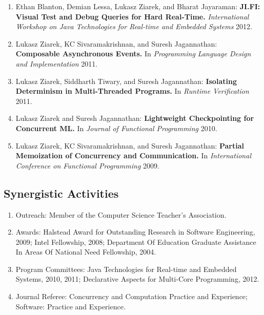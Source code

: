 \documentclass[times,11pt]{article}
\begin{document}
\noindent
\begin{enumerate}\setlength{\itemsep}{\myspace}

\item Ethan Blanton, Demian Lessa, Lukasz Ziarek, and Bharat Jayaraman:                                                                                                 
{\bf JI.FI: Visual Test and Debug Queries for Hard Real-Time.}                                                                                                          
{\it International Workshop on Java Technologies for Real-time and Embedded Systems} 2012.  

\item Lukasz Ziarek, KC Sivaramakrishnan, and Suresh Jagannathan:
{\bf Composable Asynchronous Events.}
In \emph{Programming Language Design and Implementation} 2011.

\item Lukasz Ziarek, Siddharth Tiwary, and Suresh Jagannathan:
{\bf Isolating Determinism in Multi-Threaded Programs.}
In \emph{Runtime Verification} 2011.

\item Lukasz Ziarek and Suresh Jagannathan:
{\bf Lightweight Checkpointing for Concurrent ML.} 
In \emph{ Journal of Functional Programming} 2010.

\item  Lukasz Ziarek, KC Sivaramakrishnan, and Suresh Jagannathan:
{\bf Partial Memoization of Concurrency and Communication.} 
In \emph{International Conference on Functional Programming} 2009.


\end{enumerate}


\subsection*{Synergistic Activities}
\noindent
\begin{enumerate}\setlength{\itemsep}{\myspace}
\item Outreach: Member of the Computer Science Teacher's Association.
\item Awards: Halstead Award for Outstanding Research in Software Engineering, 2009;
Intel Fellowship, 2008; 
Department Of Education Graduate Assistance In Areas Of National Need Fellowship, 2004.
\item Program Committees: Java Technologies for Real-time and Embedded Systems, 2010, 2011; 
Declarative Aspects for Multi-Core Programming, 2012.
\item Journal Referee: Concurrency and Computation Practice and Experience; Software: Practice and Experience.
\end{enumerate}
\end{document}

